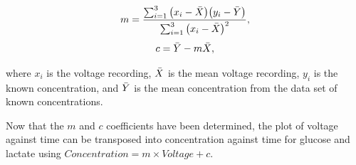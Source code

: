 \begin{equation}
    m = \frac{ \sum_{i=1}^{3} \big( x_{i} - \Bar{X} \big) \big( y_{i} - \Bar{Y} \big) }{ \sum_{i=1}^{3} \big( x_{i} - \Bar{X} \big)^{2} },
    \label{equation: least squares regression}
\end{equation}
\begin{equation}
    c = \Bar{Y} - m\Bar{X},
\end{equation}

\noindent where $x_{i}$ is the voltage recording, $\Bar{X}$ is the mean voltage recording, $y_i$ is the known concentration, and $\Bar{Y}$ is the mean concentration from the data set of known concentrations. 

Now that the $m$ and $c$ coefficients have been determined, the plot of voltage against time can be transposed into concentration against time for glucose and lactate using $Concentration = m \times Voltage + c$.


